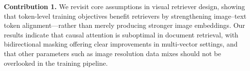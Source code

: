 
\noindent\textbf{Contribution 1.}\; We revisit core assumptions in visual retriever design, showing that token-level training objectives benefit retrievers by strengthening image–text token alignment—rather than merely producing stronger image embeddings.
Our results indicate that causal attention is suboptimal in document retrieval, with bidirectional masking offering clear improvements in multi-vector settings, and that other parameters such as image resolution data mixes should not be overlooked in the training pipeline.




